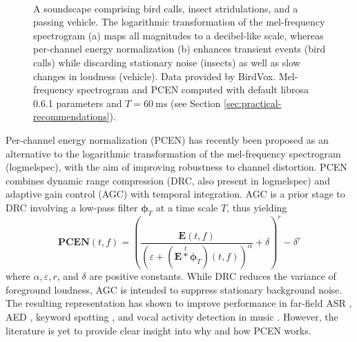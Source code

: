 \documentclass[journal]{IEEEtran}
\theoremstyle{remark}
\begin{document}
\begin{figure}
\centering
{}\\
\caption{A soundscape comprising bird calls, insect stridulations, and a passing vehicle.
The logarithmic transformation of the mel-frequency spectrogram (a) maps all magnitudes to a decibel-like scale, whereas per-channel energy normalization (b) enhances transient events (bird calls) while discarding stationary noise (insects) as well as slow changes in loudness (vehicle). Data provided by BirdVox. Mel-frequency spectrogram and PCEN computed with default librosa 0.6.1 parameters and $T=\SI{60}{\milli\second}$ (see Section \ref{sec:practical-recommendations}).}
\label{fig:spectrogram}
\end{figure} 

Per-channel energy normalization (PCEN) \cite{wang2017icassp} has recently been proposed as an alternative to the logarithmic transformation of the mel-frequency spectrogram (logmelspec), with the aim of improving robustness to channel distortion.
PCEN combines dynamic range compression (DRC, also present in logmelspec) and adaptive gain control (AGC) with temporal integration. AGC is a prior stage to DRC involving a low-pass filter $\mathbf{\phi}_T$ at a time scale $T$, thus yielding
\begin{equation}
\mathbf{PCEN}(t,f) =
\left(\dfrac{\mathbf{E}(t,f)}{(\varepsilon+(\mathbf{E}\overset{t}{\ast}\boldsymbol{\phi}_T)(t,f))^\alpha} + \delta\right)^r - \delta^r
\end{equation}
where $\alpha, \varepsilon, r$, and $\delta$ are positive constants.
While DRC reduces the variance of foreground loudness, AGC is intended to suppress stationary background noise.
The resulting representation has shown to improve performance in far-field ASR \cite{battenberg2017arxiv}, AED \cite{krstulovic2018casse}, keyword spotting \cite{wang2017icassp, shan2018attention}, and vocal activity detection in music \cite{schluter2018ismir}. However, the literature is yet to provide clear insight into why and how PCEN works.
\end{document}
